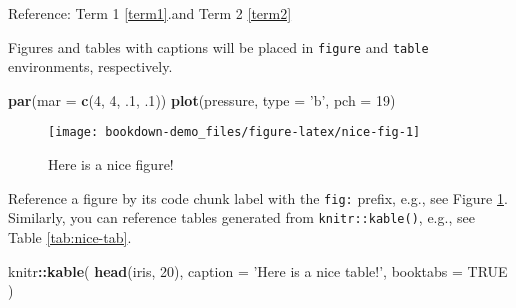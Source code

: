 \documentclass[]{book}
\newenvironment{Shaded}{\begin{snugshade}}{\end{snugshade}}
\newcommand{\DataTypeTok}[1]{\textcolor[rgb]{0.13,0.29,0.53}{#1}}
\newcommand{\DecValTok}[1]{\textcolor[rgb]{0.00,0.00,0.81}{#1}}
\newcommand{\FloatTok}[1]{\textcolor[rgb]{0.00,0.00,0.81}{#1}}
\newcommand{\KeywordTok}[1]{\textcolor[rgb]{0.13,0.29,0.53}{\textbf{#1}}}
\newcommand{\NormalTok}[1]{#1}
\newcommand{\OperatorTok}[1]{\textcolor[rgb]{0.81,0.36,0.00}{\textbf{#1}}}
\newcommand{\OtherTok}[1]{\textcolor[rgb]{0.56,0.35,0.01}{#1}}
\newcommand{\StringTok}[1]{\textcolor[rgb]{0.31,0.60,0.02}{#1}}
\begin{document}
Reference: Term 1 \ref{term1}.and Term 2 \ref{term2}

Figures and tables with captions will be placed in \texttt{figure} and \texttt{table} environments, respectively.

\begin{Shaded}
\begin{Highlighting}[]
\KeywordTok{par}\NormalTok{(}\DataTypeTok{mar =} \KeywordTok{c}\NormalTok{(}\DecValTok{4}\NormalTok{, }\DecValTok{4}\NormalTok{, }\FloatTok{.1}\NormalTok{, }\FloatTok{.1}\NormalTok{))}
\KeywordTok{plot}\NormalTok{(pressure, }\DataTypeTok{type =} \StringTok{'b'}\NormalTok{, }\DataTypeTok{pch =} \DecValTok{19}\NormalTok{)}
\end{Highlighting}
\end{Shaded}

\begin{figure}

{\centering \texttt{[image: bookdown-demo\_files/figure-latex/nice-fig-1]} 

}

\caption{Here is a nice figure!}\label{fig:nice-fig}
\end{figure}

Reference a figure by its code chunk label with the \texttt{fig:} prefix, e.g., see Figure \ref{fig:nice-fig}. Similarly, you can reference tables generated from \texttt{knitr::kable()}, e.g., see Table \ref{tab:nice-tab}.

\begin{Shaded}
\begin{Highlighting}[]
\NormalTok{knitr}\OperatorTok{::}\KeywordTok{kable}\NormalTok{(}
  \KeywordTok{head}\NormalTok{(iris, }\DecValTok{20}\NormalTok{), }\DataTypeTok{caption =} \StringTok{'Here is a nice table!'}\NormalTok{,}
  \DataTypeTok{booktabs =} \OtherTok{TRUE}
\NormalTok{)}
\end{Highlighting}
\end{Shaded}
\end{document}
